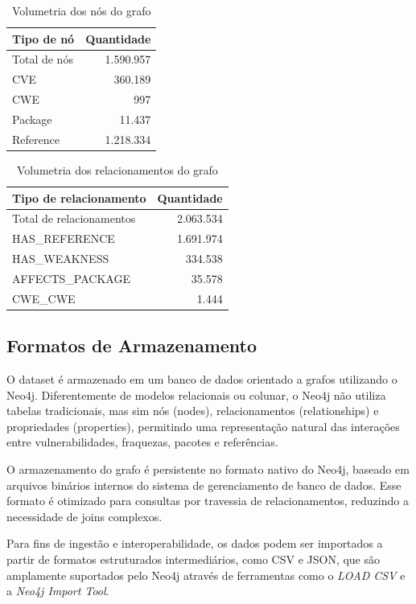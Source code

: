 \begin{table}[H]
    \centering
    \caption{Volumetria dos nós do grafo}
    \label{tab:vol-nodes}
    \begin{tabular}{|l|r|}
        \hline
        \textbf{Tipo de nó} & \textbf{Quantidade} \\ \hline
        Total de nós        & 1.590.957           \\ \hline
        CVE                 & 360.189             \\ \hline
        CWE                 & 997                 \\ \hline
        Package             & 11.437              \\ \hline
        Reference           & 1.218.334           \\ \hline
    \end{tabular}
\end{table}

\begin{table}[H]
    \centering
    \caption{Volumetria dos relacionamentos do grafo}
    \label{tab:vol-relationships}
    \begin{tabular}{|l|r|}
        \hline
        \textbf{Tipo de relacionamento} & \textbf{Quantidade} \\ \hline
        Total de relacionamentos        & 2.063.534           \\ \hline
        HAS\_REFERENCE                  & 1.691.974           \\ \hline
        HAS\_WEAKNESS                   & 334.538             \\ \hline
        AFFECTS\_PACKAGE                & 35.578              \\ \hline
        CWE\_CWE                        & 1.444               \\ \hline
    \end{tabular}
\end{table}


\subsection{Formatos de Armazenamento}

O dataset é armazenado em um banco de dados orientado a grafos utilizando o Neo4j. Diferentemente de modelos relacionais ou colunar, o Neo4j não utiliza tabelas tradicionais, mas sim nós (nodes), relacionamentos (relationships) e propriedades (properties), permitindo uma representação natural das interações entre vulnerabilidades, fraquezas, pacotes e referências.

O armazenamento do grafo é persistente no formato nativo do Neo4j, baseado em arquivos binários internos do sistema de gerenciamento de banco de dados. Esse formato é otimizado para consultas por travessia de relacionamentos, reduzindo a necessidade de joins complexos.

Para fins de ingestão e interoperabilidade, os dados podem ser importados a partir de formatos estruturados intermediários, como CSV e JSON, que são amplamente suportados pelo Neo4j através de ferramentas como o \textit{LOAD CSV} e a \textit{Neo4j Import Tool}.